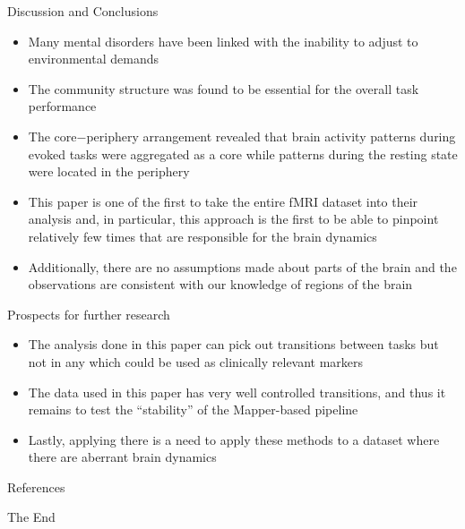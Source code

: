 \documentclass[handout]{beamer}
\begin{document}
\begin{frame}{Discussion and Conclusions}
    \begin{itemize}
        \item Many mental disorders have been linked with the inability to adjust to environmental demands
        \item The community structure was found to be essential for the overall task performance
        \item The core$-$periphery arrangement revealed that brain activity patterns during evoked tasks were aggregated as a core while patterns during the resting state were located in the periphery
        \item This paper is one of the first to take the entire fMRI dataset into their analysis and, in particular, this approach is the first to be able to pinpoint relatively few times that are responsible for the brain dynamics
        \item Additionally, there are no assumptions made about parts of the brain and the observations are consistent with our knowledge of regions of the brain
    \end{itemize}
\end{frame}

\begin{frame}{Prospects for further research}
    \begin{itemize}
        \item The analysis done in this paper can pick out transitions between tasks but not in any which could be used as clinically relevant markers
        \item The data used in this paper has very well controlled transitions, and thus it remains to test the ``stability'' of the Mapper-based pipeline
        \item Lastly, applying there is a need to apply these methods to a dataset where there are aberrant brain dynamics
    \end{itemize}
\end{frame}

\begin{frame}[allowframebreaks]{References}
\printbibliography
\end{frame}


\begin{frame}
\Huge{\centerline{The End}}
\end{frame}

\end{document}
